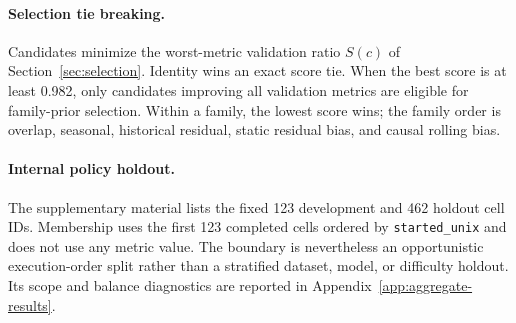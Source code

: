 \paragraph{Selection tie breaking.}
Candidates minimize the worst-metric validation ratio $S(c)$ of
Section~\ref{sec:selection}. Identity wins an exact
score tie. When the best score is at least 0.982, only candidates improving
all validation metrics are eligible for family-prior selection. Within a
family, the lowest score wins; the family order is overlap, seasonal,
historical residual, static residual bias, and causal rolling bias.

\paragraph{Internal policy holdout.}
The supplementary material lists the fixed 123 development and 462 holdout
cell IDs. Membership uses the first 123 completed cells ordered by
\texttt{started\_unix} and does not use any metric value. The boundary is
nevertheless an opportunistic execution-order split rather than a stratified
dataset, model, or difficulty holdout. Its scope and balance diagnostics are
reported in Appendix~\ref{app:aggregate-results}.
